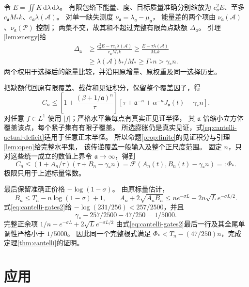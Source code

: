 \documentclass[UTF8,a4paper,11pt,fontset=fandol]{ctexart}
\theoremstyle{remark}
\newcommand{\dint}{\,\mathrm d}
\newcommand{\Fcal}{\mathcal F}
\begin{document}
令 $E=\iint K\dint\lambda\dint\lambda$。
有限包络下能量、度、目标质量准确分别缩放为
$c_{\mathfrak a}^2E$、至多 $c_{\mathfrak a}M_*k$、$c_{\mathfrak a}\lambda(\mathcal A)$。
对单一缺失测度 $\nu_{\mathfrak a}=\lambda_{\mathfrak a}-\mu_{\mathfrak a}$，
能量差的两个项由 $\nu_{\mathfrak a}(\mathcal A)$、$\nu_{\mathfrak a}(\mathcal P)$ 控制；
两集不交，故其和不超过完整有限角点缺额 $\Delta_{\mathfrak a}$。
引理\ref{lem:energy}给
\begin{equation}\label{eq:cantelli-actual-deficit}
\begin{aligned}
 \Delta_{\mathfrak a}
 &\ge\frac{c_{\mathfrak a}^2E-\tau c_{\mathfrak a}\lambda(\mathcal A)}
              {c_{\mathfrak a}M_*k}
 \ge\frac{E-\tau\lambda(\mathcal A)}{M_*k}\\
 &\ge\lambda(\mathcal A)b_*/M_*\ge\Gamma_*n>\gamma_*n.
\end{aligned}
\end{equation}
两个权用于选择后的能量比较，并沿用原增量、原权重及同一选择历史。

把缺额代回原有限覆盖、载荷和见证积分，保留整个覆盖因子，得
\[
 C_n\le\left[1+\frac{(\beta+1/\mathfrak a)^n}{\tau}\right]
 \left[\tau+\mathfrak a^{-n}+\alpha^{-n}J_{\mathfrak a}(t)-\gamma_*n\right].
\]
对任意 $f\in L^1$ 使用 $|f|$；严格水平集每点有真实正见证半径，
其 $\mathfrak a$ 倍缩小立方体覆盖该点，每个紧子集有有限子覆盖。
所选膨胀仍是真实见证，式\eqref{eq:cantelli-actual-deficit}适用于任意正末半径。
所以命题\ref{prop:finite}的见证积分与引理\ref{lem:open}给完整水平集，
该传递覆盖一般输入及整个正尺度范围。
固定 $n$，只对这些统一成立的数值上界令 $\mathfrak a\to\infty$，得到
\begin{equation}\label{eq:cantelli-fullcost}
 C_n\le(1+A_n/\tau)(\tau+B_n-\gamma_*n)
       =\Fcal(A_n(t),B_n(t)-\gamma_*n)=:\Phi_*.
\end{equation}
极限只用于上述标量常数。

最后保留准确正价格 $-\log(1-\sigma)$。
由原标量估计，
\[
 B_n\le T_n-n\log(1-\sigma)+1,\qquad
 A_n+2\sqrt{A_nB_n}\le n e^{-\sigma L}+2n\sqrt L e^{-\sigma L/2}.
\]
式\eqref{eq:cantelli-gates2}给 $-\log(231/256)<257/2500$，并且
\[
 \gamma_*-257/2500-47/250=1/5000.
\]
完整正余项 $1/n+e^{-\sigma L}+2\sqrt L e^{-\sigma L/2}$
由式\eqref{eq:cantelli-gates2}最后一行及其全尾单调性严格小于 $1/5000$。
因此同一个完整根式满足
$\Phi_*<T_n-(47/250)n$，完成定理\ref{thm:cantelli}的证明。

\section{应用}\label{sec:application}
\end{document}
